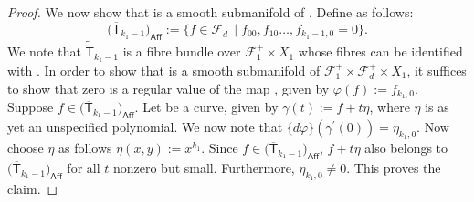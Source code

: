 \documentclass[pdftex]{sigma}
\numberwithin{equation}{section}
\begin{document}
\begin{proof}
We now show that  is a smooth submanifold
of .
Define  as follows:
\[ \bigl(\overline{\mathsf{T}}_{k_1-1}\bigr)_{\mathsf{Aff}} :=
\bigl\{ f \in \mathcal{F}_d^{+}\mid f_{00}, f_{10} \dots, f_{k_1-1, 0} =0\bigr\}. \]
We note that
$\widetilde{\overline{\mathsf{T}}}_{k_1-1}$
is a fibre bundle over $\mathcal{F}_1^+\times X_1$
whose fibres can be identified with
.
In order to show that
 is a smooth submanifold of
$\mathcal{F}_1^+\times \mathcal{F}_d^+\times X_1$, it suffices to show that
zero is a regular value of the map
, given by
$\varphi(f):= f_{k_1, 0}$.
Suppose
$f \in \bigl(\overline{\mathsf{T}}_{k_1-1}\bigr)_{\mathsf{Aff}}$.
Let 
be a curve, given by
$\gamma(t):= f+t\eta$,
where $\eta$ is as yet an unspecified polynomial. We now note that
$\{d \varphi\}(\gamma^{\prime}(0)) = \eta_{k_1, 0}$. Now choose $\eta$ as follows
$\eta(x, y) := x^{k_1}$.
Since
$f \in \bigl(\overline{\mathsf{T}}_{k_1-1}\bigr)_{\mathsf{Aff}}$,
$f + t \eta$ also belongs to $\bigl(\overline{\mathsf{T}}_{k_1-1}\bigr)_{\mathsf{Aff}}$
for all $t$ nonzero but small.
Furthermore, $\eta_{k_1, 0} \neq 0$. This proves the claim.


\end{proof}
\end{document}
